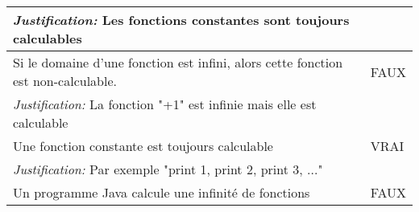 \begin{longtable}{p{13cm}|l}
    \textit{Justification:} Les fonctions constantes sont toujours calculables & \\
    \hline
    Si le domaine d'une fonction est infini, alors cette fonction est non-calculable. & FAUX \\
    \textit{Justification:} La fonction "+1" est infinie mais elle est calculable \\
    \hline
    Une fonction constante est toujours calculable & VRAI \\
    \textit{Justification:} Par exemple "print 1, print 2, print 3, ..." \\
    \hline
    Un programme Java calcule une infinité de fonctions & FAUX \\

\end{longtable}
